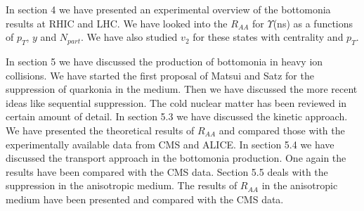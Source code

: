 In section 4 we have presented an experimental overview of the bottomonia results at RHIC and LHC. 
We have looked into the $R_{AA}$ for $\Upsilon$(ns) as a functions of $p_T$, $y$ and $N_{part}$. 
We have also studied $v_2$ for these states with centrality and $p_T$. 

In section 5 we have discussed the production of bottomonia in heavy ion collisions. We have started the first proposal of 
Matsui and Satz for the suppression of quarkonia in the medium. Then we have discussed the more recent ideas like 
sequential suppression. The cold nuclear matter has been reviewed in certain amount of detail. In section 5.3 
we have discussed the kinetic approach. We have presented the theoretical results of $R_{AA}$ and compared those with the 
experimentally available data from CMS and ALICE. In section 5.4 we have discussed the transport approach in the 
bottomonia production. One again the results have been compared with the CMS data. Section 5.5 deals with the 
suppression in the anisotropic medium. The results of $R_{AA}$ in the anisotropic medium have been presented 
and compared with the CMS data. 

